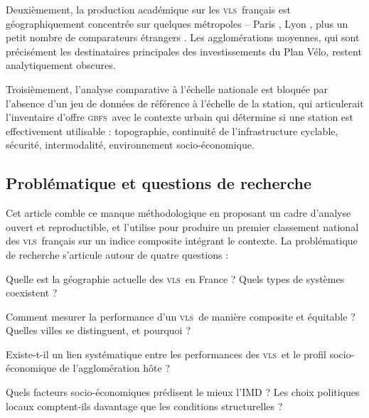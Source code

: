 \documentclass[11pt,a4paper]{article}
\newcommand{\VLS}{\textsc{vls}\xspace}
\newcommand{\GBFS}{\textsc{gbfs}\xspace}
\begin{document}
Deuxièmement, la production académique sur les \VLS\ français est
géographiquement concentrée sur quelques métropoles -- Paris
\citep{Borgnat2011, Etienne2014}, Lyon \citep{Borgnat2011}, plus
un petit nombre de comparateurs étrangers \citep{Vogel2011,
Hampshire2012}. Les agglomérations moyennes, qui sont précisément
les destinataires principales des investissements du Plan Vélo,
restent analytiquement obscures.

Troisièmement, l'analyse comparative à l'échelle nationale est
bloquée par l'absence d'un jeu de données de référence à l'échelle
de la station, qui articulerait l'inventaire d'offre \GBFS\ avec le
contexte urbain qui détermine si une station est effectivement
utilisable : topographie, continuité de l'infrastructure cyclable,
sécurité, intermodalité, environnement socio-économique.

\subsection{Problématique et questions de recherche}
\label{sec:contexte-rq}

Cet article comble ce manque méthodologique en proposant un cadre
d'analyse ouvert et reproductible, et l'utilise pour produire un
premier classement national des \VLS\ français sur un indice
composite intégrant le contexte. La problématique de recherche
s'articule autour de quatre questions :

\begin{description}[leftmargin=2em,itemsep=0.3em]
    \item[\textbf{Q1 -- Inventaire.}] Quelle est la géographie
    actuelle des \VLS\ en France ? Quels types de systèmes
    coexistent ?
    \item[\textbf{Q2 -- Performance.}] Comment mesurer la
    performance d'un \VLS\ de manière composite et équitable ?
    Quelles villes se distinguent, et pourquoi ?
    \item[\textbf{Q3 -- Équité.}] Existe-t-il un lien systématique
    entre les performances des \VLS\ et le profil socio-économique
    de l'agglomération hôte ?
    \item[\textbf{Q4 -- Prédiction.}] Quels facteurs
    socio-économiques prédisent le mieux l'IMD ? Les choix
    politiques locaux comptent-ils davantage que les conditions
    structurelles ?
\end{description}
\end{document}
